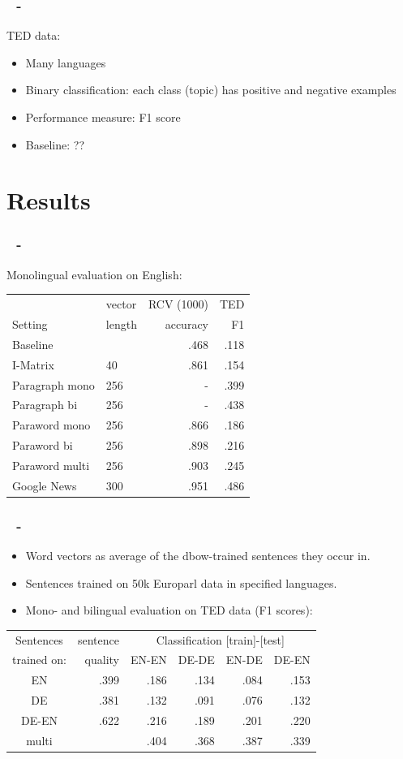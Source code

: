 \documentclass{beamer}
\newenvironment{dia}
{
\begin{frame}[fragile, environment=dia]
\frametitle{\insertsection
\ifx\insertsubsection\empty\else
      \,~-~\insertsubsection             %
   \fi}
}
{
\end{frame}
}
\begin{document}
\begin{dia}
TED data:
\begin{itemize}
\item Many languages
\item Binary classification: each class (topic) has positive and negative examples
\item Performance measure: F1 score
\item Baseline: ??
\end{itemize}
\end{dia}

\section{Results}
\begin{dia}
Monolingual evaluation on English:
\begin{table}
\begin{tabular}{l l r r}
 			&vector	&RCV (1000)		&TED		\\
Setting		&length	&accuracy		&F1		\\\hline
Baseline		&		&.468			&.118	 	\\
I-Matrix		&40		&.861			&.154		\\
Paragraph mono	&256		&-			&.399		\\
Paragraph bi 	&256		&-			&.438		\\
Paraword mono	&256		&.866			&.186		\\
Paraword bi 		&256		&.898			&.216		\\
Paraword multi 	&256		&.903			&.245		\\	
Google News		&300		&.951			&.486		\\
\end{tabular}
\end{table}
\end{dia}


\begin{dia}
\begin{itemize}
\item Word vectors as average of the dbow-trained sentences they occur in.
\item Sentences trained on 50k Europarl data in specified languages.
\item Mono- and bilingual evaluation on TED data (F1 scores):
\end{itemize}
\begin{table}
\begin{tabular}{c | r|r r r r }
Sentences 		&sentence	&	\multicolumn{4}{c}{Classification [train]-[test]}	\\
trained on: 		&quality	&EN-EN	&DE-DE	&EN-DE	&DE-EN	\\\hline
EN			&.399		&.186		&.134		&.084		&.153		\\
DE			&.381		&.132		&.091		&.076		&.132	\\
DE-EN			&.622		&.216		&.189		&.201		&.220		\\
multi 			&		&.404		&.368		&.387		&.339		\\
\end{tabular}
\end{table}
\end{dia}
\end{document}
